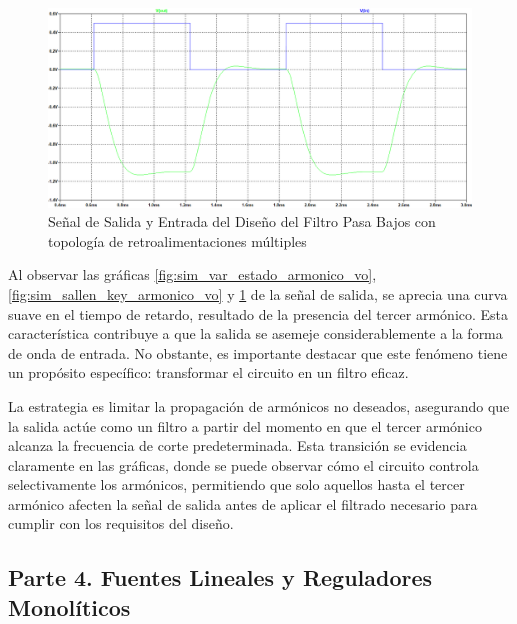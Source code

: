\begin{enumerate}
\begin{itemize}
                    \begin{figure}[H]
                      \centering
                      \renewcommand{\figurename}{Gráfica}
                      \includegraphics[width=15cm]{Imagenes/sim_retro_armonico_vo.png}
                      \caption{Señal de Salida y Entrada del Diseño del Filtro Pasa Bajos con topología de retroalimentaciones múltiples}
                      \label{fig:sim_retro_armonico_vo}
                    \end{figure}
            \end{itemize}

            Al observar las gráficas \ref{fig:sim_var_estado_armonico_vo}, \ref{fig:sim_sallen_key_armonico_vo} y \ref{fig:sim_retro_armonico_vo} de la señal de salida, se aprecia una curva suave en el tiempo de retardo, resultado de la presencia del tercer armónico. Esta característica contribuye a que la salida se asemeje considerablemente a la forma de onda de entrada. No obstante, es importante destacar que este fenómeno tiene un propósito específico: transformar el circuito en un filtro eficaz.

            La estrategia es limitar la propagación de armónicos no deseados, asegurando que la salida actúe como un filtro a partir del momento en que el tercer armónico alcanza la frecuencia de corte predeterminada. Esta transición se evidencia claramente en las gráficas, donde se puede observar cómo el circuito controla selectivamente los armónicos, permitiendo que solo aquellos hasta el tercer armónico afecten la señal de salida antes de aplicar el filtrado necesario para cumplir con los requisitos del diseño.
    \end{enumerate}

\newpage
\subsection{Parte 4. Fuentes Lineales y Reguladores Monolíticos}
